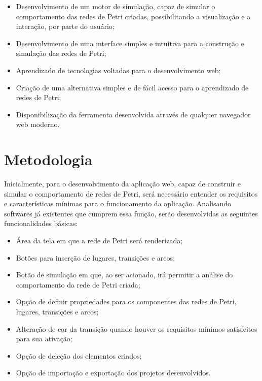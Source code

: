 \documentclass[
	12pt,				%
	openright,			%
	oneside,			%
	a4paper,			%
	english,			%
	brazil				%
	]{abntex2}
\begin{document}
\begin{itemize}
        \item Desenvolvimento de um motor de simulação, capaz de simular o comportamento das redes de Petri criadas, possibilitando a visualização e a interação, por parte do usuário;
        \item Desenvolvimento de uma interface simples e intuitiva para a construção e simulação das redes de Petri;
	\item Aprendizado de tecnologias voltadas para o desenvolvimento web; 
	\item Criação de uma alternativa simples e de fácil acesso para o aprendizado de redes de Petri;
        \item Disponibilização da ferramenta desenvolvida através de qualquer navegador web moderno.
\end{itemize}


\section{Metodologia}


Inicialmente, para o desenvolvimento da aplicação web, capaz de construir e simular o comportamento de redes de Petri, será necessário entender os requisitos e características mínimas para o funcionamento da aplicação. Analisando softwares já existentes que cumprem essa função, serão desenvolvidas as seguintes funcionalidades básicas:

\begin{itemize}
        \item Área da tela em que a rede de Petri será renderizada;
        \item Botões para inserção de lugares, transições e arcos;
        \item Botão de simulação em que, ao ser acionado, irá permitir a análise do comportamento da rede de Petri criada;
        \item Opção de definir propriedades para os componentes das redes de Petri, lugares, transições e arcos;
        \item Alteração de cor da transição quando houver os requisitos mínimos satisfeitos para sua ativação;
        \item Opção de deleção dos elementos criados;
        \item Opção de importação e exportação dos projetos desenvolvidos.
\end{itemize}
\end{document}
